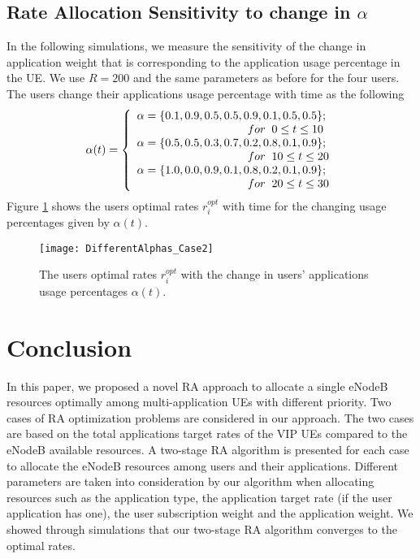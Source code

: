\documentclass[journal]{IEEEtran} 				\IEEEoverridecommandlockouts 						\usepackage{amsmath,amssymb}
\begin{document}
\subsection{Rate Allocation Sensitivity to change in $\alpha$}
In the following simulations, we measure the sensitivity of the change in application weight that is corresponding to the application usage percentage in the UE. We use $R=200$ and the same parameters as before for the four users. The users change their applications usage percentage with time as the following
\begin{equation}
\alpha(t) = \left\{
  \begin{array}{l l}
    \alpha = \{0.1,0.9,0.5,0.5,0.9,0.1,0.5,0.5\};\\
    \;\;\;\;\;\;\;\;\;\;\;\;\;\;\;\;\;\;\;\;\;\;\;\;\;\;\;\;\;\;\;\;\;\;\;for\;\; 0  \le t \le 10\\
    \alpha = \{0.5, 0.5, 0.3, 0.7, 0.2, 0.8, 0.1, 0.9\};\\
    \;\;\;\;\;\;\;\;\;\;\;\;\;\;\;\;\;\;\;\;\;\;\;\;\;\;\;\;\;\;\;\;\;\;\;for\;\; 10  \le t \le 20\\
    \alpha = \{1.0, 0.0, 0.9, 0.1, 0.8, 0.2, 0.1, 0.9\};\\
    \;\;\;\;\;\;\;\;\;\;\;\;\;\;\;\;\;\;\;\;\;\;\;\;\;\;\;\;\;\;\;\;\;\;\;for\;\; 20  \le t \le 30\\
  \end{array} \right.
\end{equation}
Figure \ref{fig:DifferentAlphas_Case2} shows the users optimal rates $r_{i}^{opt}$ with time for the changing usage percentages given by $\alpha(t)$.
\begin{figure}
\centering
\texttt{[image: DifferentAlphas\_Case2]}
\caption{The users optimal rates $r_{i}^{opt}$ with the change in users' applications usage percentages $\alpha(t)$.}
\label{fig:DifferentAlphas_Case2}
\end{figure}
\section{Conclusion}\label{sec:conclude}
In this paper, we proposed a novel RA approach to allocate a single eNodeB resources optimally among multi-application UEs with different priority. Two cases of RA optimization problems are considered in our approach. The two cases are based on the total applications target rates of the VIP UEs compared to the eNodeB available resources. A two-stage RA algorithm is presented for each case to allocate the eNodeB resources among users and their applications. Different parameters are taken into consideration by our algorithm when allocating resources such as the application type, the application target rate (if the user application has one), the user subscription weight and the application weight. We showed through simulations that our two-stage RA algorithm converges to the optimal rates.

\end{document}
